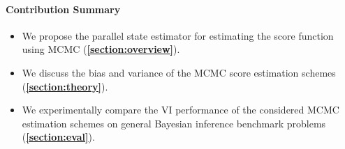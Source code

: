 

\paragraph{Contribution Summary}
\begin{itemize}[noitemsep]
\item[\ding{228}] We propose the parallel state estimator for estimating the score function using MCMC (\textbf{\cref{section:overview}}).
\item[\ding{228}] We discuss the bias and variance of the MCMC score estimation schemes (\textbf{\cref{section:theory}}).
\item[\ding{228}] We experimentally compare the VI performance of the considered MCMC estimation schemes on general Bayesian inference benchmark problems (\textbf{\cref{section:eval}}).
\end{itemize}

